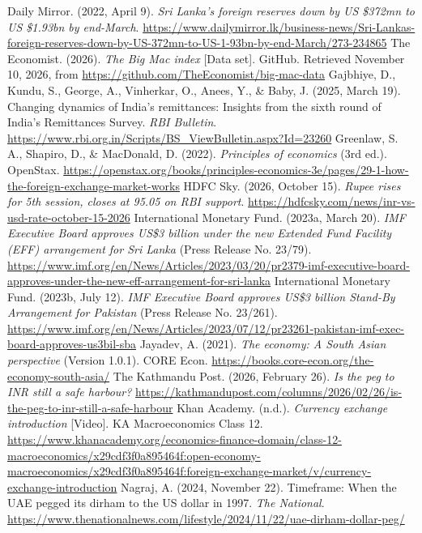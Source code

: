  Daily Mirror. (2022, April 9). \emph{Sri Lanka's foreign reserves down by US \$372mn to US \$1.93bn by end-March}. \url{https://www.dailymirror.lk/business-news/Sri-Lankas-foreign-reserves-down-by-US-372mn-to-US-1-93bn-by-end-March/273-234865}
 The Economist. (2026). \emph{The Big Mac index} [Data set]. GitHub. Retrieved November 10, 2026, from \url{https://github.com/TheEconomist/big-mac-data}
 Gajbhiye, D., Kundu, S., George, A., Vinherkar, O., Anees, Y., \& Baby, J. (2025, March 19). Changing dynamics of India’s remittances: Insights from the sixth round of India’s Remittances Survey. \emph{RBI Bulletin}. \url{https://www.rbi.org.in/Scripts/BS_ViewBulletin.aspx?Id=23260}
 Greenlaw, S. A., Shapiro, D., \& MacDonald, D. (2022). \emph{Principles of economics} (3rd ed.). OpenStax. \url{https://openstax.org/books/principles-economics-3e/pages/29-1-how-the-foreign-exchange-market-works}
 HDFC Sky. (2026, October 15). \emph{Rupee rises for 5th session, closes at 95.05 on RBI support}. \url{https://hdfcsky.com/news/inr-vs-usd-rate-october-15-2026}
 International Monetary Fund. (2023a, March 20). \emph{IMF Executive Board approves US\$3 billion under the new Extended Fund Facility (EFF) arrangement for Sri Lanka} (Press Release No. 23/79). \url{https://www.imf.org/en/News/Articles/2023/03/20/pr2379-imf-executive-board-approves-under-the-new-eff-arrangement-for-sri-lanka}
 International Monetary Fund. (2023b, July 12). \emph{IMF Executive Board approves US\$3 billion Stand-By Arrangement for Pakistan} (Press Release No. 23/261). \url{https://www.imf.org/en/News/Articles/2023/07/12/pr23261-pakistan-imf-exec-board-approves-us3bil-sba}
 Jayadev, A. (2021). \emph{The economy: A South Asian perspective} (Version 1.0.1). CORE Econ. \url{https://books.core-econ.org/the-economy-south-asia/}
 The Kathmandu Post. (2026, February 26). \emph{Is the peg to INR still a safe harbour?} \url{https://kathmandupost.com/columns/2026/02/26/is-the-peg-to-inr-still-a-safe-harbour}
 Khan Academy. (n.d.). \emph{Currency exchange introduction} [Video]. KA Macroeconomics Class 12. \url{https://www.khanacademy.org/economics-finance-domain/class-12-macroeconomics/x29cdf3f0a895464f:open-economy-macroeconomics/x29cdf3f0a895464f:foreign-exchange-market/v/currency-exchange-introduction}
 Nagraj, A. (2024, November 22). Timeframe: When the UAE pegged its dirham to the US dollar in 1997. \emph{The National}. \url{https://www.thenationalnews.com/lifestyle/2024/11/22/uae-dirham-dollar-peg/}
